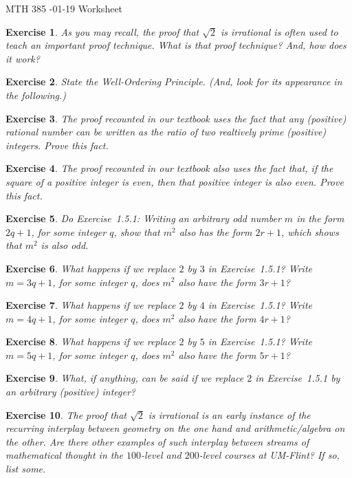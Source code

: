 \documentclass[12pt]{article}
\theoremstyle{plain}
\newtheorem{ex}{Exercise}
\begin{document}
MTH 385 -01-19 Worksheet

\begin{ex}
  As you may recall, the proof that $\sqrt{2}$ is irrational is often used to teach an important proof technique. What is that proof technique? And, how does it work?
\end{ex}

\begin{ex}
  State the Well-Ordering Principle. (And, look for its appearance in the following.)
\end{ex}

\begin{ex}
  The proof recounted in our textbook uses the fact that any (positive) rational number can be written as the ratio of two realtively prime (positive) integers. Prove this fact.
\end{ex}

\begin{ex}
  The proof recounted in our textbook also uses the fact that, if the square of a positive integer is even, then that positive integer is also even. Prove this fact.
\end{ex}

\begin{ex}
  Do Exercise~1.5.1: Writing an arbitrary odd number $m$ in the form $2q+1$, for some integer $q$, show that $m^2$ also has the form $2r+1$, which shows that $m^2$ is also odd.
\end{ex}

\begin{ex}
  What happens if we replace $2$ by $3$ in Exercise~1.5.1? Write $m=3q+1$, for some integer $q$, does $m^2$ also have the form $3r+1$?
\end{ex}

\begin{ex}
  What happens if we replace $2$ by $4$ in Exercise~1.5.1? Write $m=4q+1$, for some integer $q$, does $m^2$ also have the form $4r+1$?
\end{ex}

\begin{ex}
  What happens if we replace $2$ by $5$ in Exercise~1.5.1? Write $m=5q+1$, for some integer $q$, does $m^2$ also have the form $5r+1$?
\end{ex}

\begin{ex}
  What, if anything, can be said if we replace $2$ in Exercise~1.5.1 by an arbitrary (positive) integer?
\end{ex}

\begin{ex}
  The proof that $\sqrt{2}$ is irrational is an early instance of the recurring interplay between geometry on the one hand and arithmetic/algebra on the other. Are there other examples of such interplay between streams of mathematical thought in the $100$-level and $200$-level courses at UM-Flint? If so, list some.
\end{ex}
\end{document}
